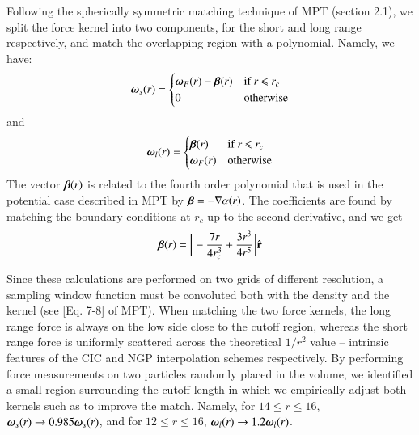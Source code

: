 \documentclass[useAMS,usenatbib]{mn2e}
\begin{document}
Following the spherically symmetric matching technique of MPT (section 2.1), 
we split  the force kernel into two components, for the short and long range respectively, and 
match the overlapping region with a polynomial. Namely, we have:
\begin{eqnarray}
\mbox{\boldmath $\omega$}_{s}(r) = \begin{cases} \mbox{\boldmath $\omega$}_{F}(r) -  \mbox{\boldmath $\beta$}(r) &\mbox{if  } \mbox{$r$ $\le$ $r_{c}$ } \\
0 & \mbox{otherwise} 
\end{cases}
\end{eqnarray}
and
\begin{eqnarray}
\mbox{\boldmath $\omega$}_{l}(r) = \begin{cases} \mbox{\boldmath $\beta$}(r) &\mbox{if  } \mbox{$r$ $\le$ $r_{c}$ } \\
 \mbox{\boldmath $\omega$}_{F}(r)  &\mbox{otherwise} 
\end{cases}
\end{eqnarray}
The vector $\mbox{\boldmath $\beta$}(r)$ is related to the fourth order polynomial that is used in the potential case described in MPT by
 $ \mbox{\boldmath $\beta$} = - {\bf \nabla} \alpha(r)$. The coefficients are found by matching the boundary conditions at $r_{c}$ up to the second derivative,
 and we get
  \begin{eqnarray}
   \mbox{\boldmath $\beta$}(r) = \bigg[ -\frac{7 r}{4 r_{c}^{3}} + \frac{3 r^{3}}{4 r^{5}}\bigg] \hat{\bf r}
  \end{eqnarray}

Since these calculations are performed on two grids of different resolution, a sampling window function must be convoluted 
both with the density and the kernel (see [Eq. 7-8] of MPT).
When matching the two force kernels, the long range force is always on the low side close to the cutoff region, whereas the short range force is uniformly scattered across the theoretical $1/r^2$ value -- intrinsic features of the CIC and NGP interpolation schemes respectively.  By performing force measurements on two particles randomly placed in the volume, we identified a small region surrounding the cutoff length in which we empirically adjust both kernels such as to improve the match. Namely, for $14 \le r \le 16$, $\mbox{\boldmath $\omega$}_{s}({r}) \rightarrow 0.985\mbox{\boldmath $\omega$}_{s}({ r})$,
and for  $12 \le r \le 16$, $\mbox{\boldmath $\omega$}_{l}({r}) \rightarrow 1.2\mbox{\boldmath $\omega$}_{l}({ r})$.
\end{document}
